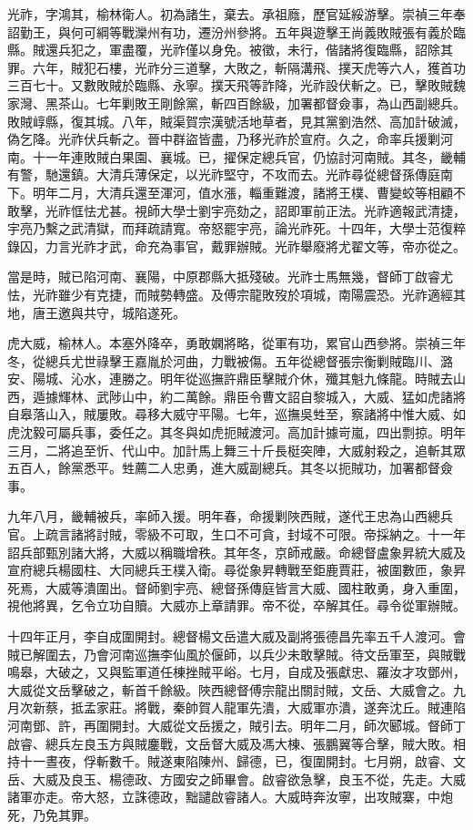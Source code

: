 \begin{pinyinscope}
光祚，字鴻其，榆林衛人。初為諸生，棄去。承祖廕，歷官延綏游擊。崇禎三年奉詔勤王，與何可綱等戰灤州有功，遷汾州參將。五年與遊擊王尚義敗賊張有義於臨縣。賊還兵犯之，軍盡覆，光祚僅以身免。被徵，未行，偕諸將復臨縣，詔除其罪。六年，賊犯石樓，光祚分三道擊，大敗之，斬隔溝飛、撲天虎等六人，獲首功三百七十。又數敗賊於臨縣、永寧。撲天飛等詐降，光祚設伏斬之。已，擊敗賊魏家灣、黑茶山。七年剿敗王剛餘黨，斬四百餘級，加署都督僉事，為山西副總兵。敗賊崞縣，復其城。八年，賊渠賀宗漢號活地草者，見其黨劉浩然、高加計破滅，偽乞降。光祚伏兵斬之。晉中群盜皆盡，乃移光祚於宣府。久之，命率兵援剿河南。十一年連敗賊白果園、襄城。已，擢保定總兵官，仍協討河南賊。其冬，畿輔有警，馳還鎮。大清兵薄保定，以光祚堅守，不攻而去。光祚尋從總督孫傳庭南下。明年二月，大清兵還至渾河，值水漲，輜重難渡，諸將王樸、曹變蛟等相顧不敢擊，光祚恇怯尤甚。視師大學士劉宇亮劾之，詔即軍前正法。光祚適報武清捷，宇亮乃繫之武清獄，而拜疏請寬。帝怒罷宇亮，論光祚死。十四年，大學士范復粹錄囚，力言光祚才武，命充為事官，戴罪辦賊。光祚舉廢將尤翟文等，帝亦從之。

當是時，賊已陷河南、襄陽，中原郡縣大抵殘破。光祚士馬無幾，督師丁啟睿尤怯，光祚雖少有克捷，而賊勢轉盛。及傅宗龍敗歿於項城，南陽震恐。光祚適經其地，唐王邀與共守，城陷遂死。

虎大威，榆林人。本塞外降卒，勇敢嫻將略，從軍有功，累官山西參將。崇禎三年冬，從總兵尤世祿擊王嘉胤於河曲，力戰被傷。五年從總督張宗衡剿賊臨川、潞安、陽城、沁水，連勝之。明年從巡撫許鼎臣擊賊介休，殲其魁九條龍。時賊去山西，遁據輝林、武陟山中，約二萬餘。鼎臣令曹文詔自黎城入，大威、猛如虎諸將自皋落山入，賊屢敗。尋移大威守平陽。七年，巡撫吳甡至，察諸將中惟大威、如虎沈毅可屬兵事，委任之。其冬與如虎扼賊渡河。高加計據岢嵐，四出剽掠。明年三月，二將追至忻、代山中。加計馬上舞三十斤長梃突陣，大威射殺之，追斬其眾五百人，餘黨悉平。甡薦二人忠勇，進大威副總兵。其冬以扼賊功，加署都督僉事。

九年八月，畿輔被兵，率師入援。明年春，命援剿陜西賊，遂代王忠為山西總兵官。上疏言諸將討賊，零級不可取，生口不可貪，封域不可限。帝採納之。十一年詔兵部甄別諸大將，大威以稱職增秩。其年冬，京師戒嚴。命總督盧象昇統大威及宣府總兵楊國柱、大同總兵王樸入衛。尋從象昇轉戰至鉅鹿賈莊，被圍數匝，象昇死焉，大威等潰圍出。督師劉宇亮、總督孫傳庭皆言大威、國柱敢勇，身入重圍，視他將異，乞令立功自贖。大威亦上章請罪。帝不從，卒解其任。尋令從軍辦賊。

十四年正月，李自成圍開封。總督楊文岳遣大威及副將張德昌先率五千人渡河。會賊已解圍去，乃會河南巡撫李仙風於偃師，以兵少未敢擊賊。待文岳軍至，與賊戰鳴皋，大破之，又與監軍道任棟挫賊平峪。七月，自成及張獻忠、羅汝才攻鄧州，大威從文岳擊破之，斬首千餘級。陜西總督傅宗龍出關討賊，文岳、大威會之。九月次新蔡，抵孟家莊。將戰，秦帥賀人龍軍先潰，大威軍亦潰，遂奔沈丘。賊連陷河南鄧、許，再圍開封。大威從文岳援之，賊引去。明年二月，師次郾城。督師丁啟睿、總兵左良玉方與賊鏖戰，文岳督大威及馮大棟、張鵬翼等合擊，賊大敗。相持十一晝夜，俘斬數千。賊遂東陷陳州、歸德，已，復圍開封。七月朔，啟睿、文岳、大威及良玉、楊德政、方國安之師畢會。啟睿欲急擊，良玉不從，先走。大威諸軍亦走。帝大怒，立誅德政，黜譴啟睿諸人。大威時奔汝寧，出攻賊寨，中炮死，乃免其罪。


\end{pinyinscope}
